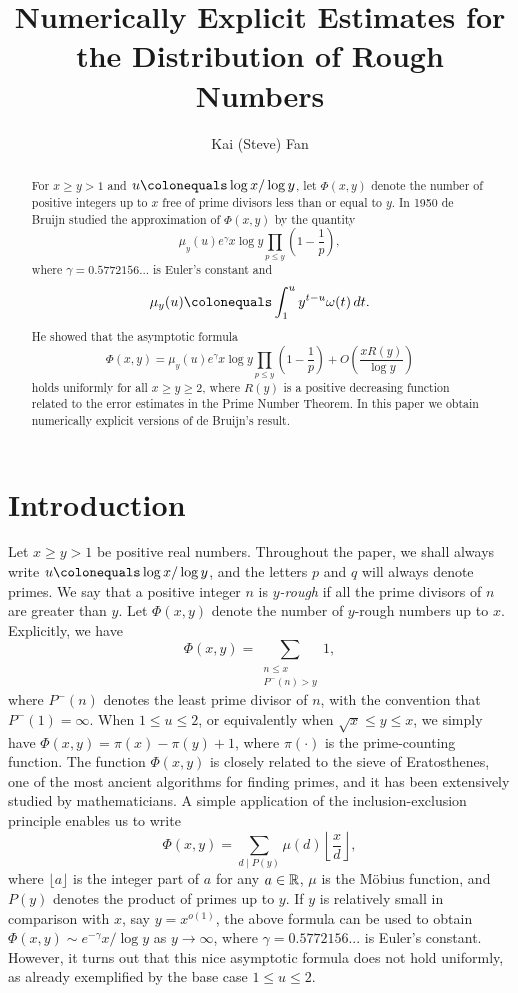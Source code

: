 \documentclass[12pt,reqno]{amsart}
\begin{document}
\title{Numerically Explicit Estimates for the Distribution of Rough Numbers}
\author{Kai (Steve) Fan}
\address{Department of Mathematics, Dartmouth College, Hanover, NH 03755, USA}
\setlength{\footskip}{8mm}
\begin{abstract}
For $x\ge y>1$ and $u\colonequals \log x/\log y$, let $\Phi(x,y)$ denote the number of positive integers up to $x$ free of prime divisors less than or equal to $y$. In 1950 de Bruijn \cite{Br} studied the approximation of $\Phi(x,y)$ by the quantity
\[\mu_y(u)e^{\gamma}x\log y\prod_{p\leq y}\left(1-\frac{1}{p}\right),\]
where $\gamma=0.5772156...$ is Euler's constant and 
\[\mu_y(u)\colonequals\int_{1}^{u}y^{t-u}\omega(t)\,dt.\]
He showed that the asymptotic formula
\[\Phi(x,y)=\mu_y(u)e^{\gamma}x\log y\prod_{p\leq y}\left(1-\frac{1}{p}\right)+O\left(\frac{xR(y)}{\log y}\right)\]
holds uniformly for all $x\ge y\ge2$, where $R(y)$ is a positive decreasing function related to
the error estimates in the Prime Number Theorem. In this paper we obtain numerically explicit versions of de Bruijn's result.
\end{abstract}


\maketitle
\section{Introduction}\label{S:Intro}
Let $x\ge y>1$ be positive real numbers. Throughout the paper, we shall always write $u\colonequals \log x/\log y$, and the letters $p$ and $q$ will always denote primes. We say that a positive integer $n$ is \emph{$y$-rough} if all the prime divisors of $n$ are greater than $y$. Let $\Phi(x,y)$ denote the number of $y$-rough numbers up to $x$. Explicitly, we have
\[\Phi(x,y)=\sum_{\substack{n\leq x\\P^-(n)>y}}1,\]
where $P^-(n)$ denotes the least prime divisor of $n$, with the convention that $P^-(1)=\infty$. When $1\le u\le 2$, or equivalently when $\sqrt{x}\le y\le x$, we simply have $\Phi(x,y)=\pi(x)-\pi(y)+1$, where $\pi(\cdot)$ is the prime-counting function. The function $\Phi(x,y)$ is closely related to the sieve of Eratosthenes, one of the most ancient algorithms for finding primes, and it has been extensively studied by mathematicians. A simple application of the inclusion-exclusion principle enables us to write
\begin{equation}\label{Equ:IE}
\Phi(x,y)=\sum_{d\mid P(y)}\mu(d)\left\lfloor\frac{x}{d}\right\rfloor,
\end{equation}
where $\lfloor a\rfloor $ is the integer part of $a$ for any $a\in\mathbb R$, $\mu$ is the M\"{o}bius function, and $P(y)$ denotes the product of primes up to $y$. If $y$ is relatively small in comparison with $x$, say $y=x^{o(1)}$, the above formula can be used to obtain $\Phi(x,y)\sim e^{-\gamma}x/\log y$ as $y\to\infty$, where $\gamma=0.5772156...$ is Euler's constant. However, it turns out that this nice asymptotic formula does not hold uniformly, as already exemplified by the base case $1\le u\le 2$.
\end{document}
